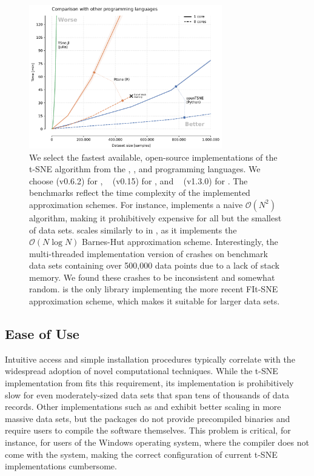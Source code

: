 \documentclass[article]{jss}
\newcommand{\opentsne}{\pkg{openTSNE}\xspace}
\begin{document}
\begin{figure}[ht]
  \centering
  \includegraphics[width=0.75\textwidth]{benchmarks_langs-final}
  \caption{\label{fig:benchmarks_lang}
  We select the fastest available, open-source implementations of the t-SNE algorithm from the , , and  programming languages. We choose \opentsne (v0.6.2) for , ~\citep{krijthe2015rtsne} (v0.15) for , and ~\citep{julia_tsne} (v1.3.0) for . The benchmarks reflect the time complexity of the implemented approximation schemes. For instance,  implements a naive $\mathcal{O}(N^2)$ algorithm, making it prohibitively expensive for all but the smallest of data sets.  scales similarly to  in , as it implements the $\mathcal{O}(N \log N)$ Barnes-Hut approximation scheme. Interestingly, the multi-threaded implementation version of  crashes on benchmark data sets containing over 500,000 data points due to a lack of stack memory. We found these crashes to be inconsistent and somewhat random. \opentsne is the only library implementing the more recent FIt-SNE approximation scheme, which makes it suitable for larger data sets. }
\end{figure}

\subsection{Ease of Use}

Intuitive access and simple installation procedures typically correlate with the widespread adoption of novel computational techniques. While the t-SNE implementation from  fits this requirement, its implementation is prohibitively slow for even moderately-sized data sets that span tens of thousands of data records. Other  implementations such as  and  exhibit better scaling in more massive data sets, but the packages do not provide precompiled binaries and require users to compile the software themselves. This problem is critical, for instance, for users of the Windows operating system, where the  compiler does not come with the system, making the correct configuration of current t-SNE implementations cumbersome.
\end{document}
